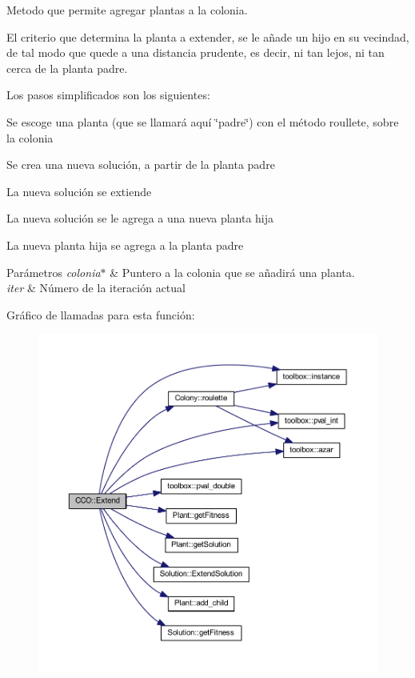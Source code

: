 Metodo que permite agregar plantas a la colonia. 

El criterio que determina la planta a extender, se le añade un hijo en su vecindad, de tal modo que quede a una distancia prudente, es decir, ni tan lejos, ni tan cerca de la planta padre.

Los pasos simplificados son los siguientes\+: 
\begin{DoxyItemize}
\item Se escoge una planta (que se llamará aquí \char`\"{}padre\char`\"{}) con el método roullete, sobre la colonia 
\item Se crea una nueva solución, a partir de la planta padre 
\item La nueva solución se extiende 
\item La nueva solución se le agrega a una nueva planta hija 
\item La nueva planta hija se agrega a la planta padre 
\end{DoxyItemize}


\begin{DoxyParams}{Parámetros}
{\em colonia$\ast$} & Puntero a la colonia que se añadirá una planta. \\
\hline
{\em iter} & Número de la iteración actual \\
\hline
\end{DoxyParams}


Gráfico de llamadas para esta función\+:
\nopagebreak
\begin{figure}[H]
\begin{center}
\leavevmode
\includegraphics[width=350pt]{class_c_c_o_a81583df8113bfdd76f5d5d541bdab892_cgraph}
\end{center}
\end{figure}


